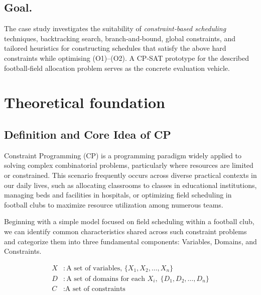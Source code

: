 \documentclass[12pt]{article}
\begin{document}
\vspace{.5\baselineskip}
\subsection{Goal.}
The case study investigates the suitability of
\emph{constraint‑based scheduling} techniques, backtracking search,
branch‑and‑bound, global constraints, and tailored heuristics for
constructing schedules that satisfy the above hard constraints while
optimising (O1)–(O2).  A CP‑SAT prototype for the described football‑field
allocation problem serves as the concrete evaluation vehicle.




\section{Theoretical foundation}



\subsection{Definition and Core Idea of CP}

Constraint Programming (CP) is a programming paradigm widely applied to solving complex combinatorial problems, particularly where resources are limited or constrained. This scenario frequently occurs across diverse practical contexts in our daily lives, such as allocating classrooms to classes in educational institutions, managing beds and facilities in hospitals, or optimizing field scheduling in football clubs to maximize resource utilization among numerous teams.

\vspace{0.5em}
\noindent
Beginning with a simple model focused on field scheduling within a football club, we can identify common characteristics shared across such constraint problems and categorize them into three fundamental components: Variables, Domains, and Constraints.

\begin{equation}
\label{eq:csp_definition}
\begin{aligned}
X &: \text{A set of variables, } \{X_1, X_2, \dots, X_n\} \\
D &: \text{A set of domains for each } X_i,\; \{D_1, D_2, \dots, D_n\} \\
C &: \text{A set of constraints}
\end{aligned}
\end{equation}
\end{document}
